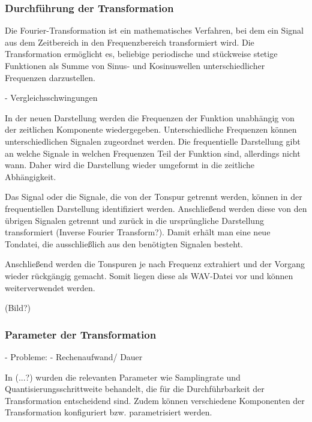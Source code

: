 \par

\subsubsection{Durchführung der Transformation}

Die Fourier-Transformation ist ein mathematisches Verfahren, bei dem ein Signal aus dem Zeitbereich in den Frequenzbereich transformiert wird. Die Transformation ermöglicht es, beliebige periodische und stückweise stetige Funktionen als Summe von Sinus- und Kosinuswellen unterschiedlicher Frequenzen darzustellen.

\par

 - Vergleichsschwingungen
 
\par

In der neuen Darstellung werden die Frequenzen der Funktion unabhängig von der zeitlichen Komponente wiedergegeben. Unterschiedliche Frequenzen können unterschiedlichen Signalen zugeordnet werden. Die frequentielle Darstellung gibt an welche Signale in welchen Frequenzen Teil der Funktion sind, allerdings nicht wann. Daher wird die Darstellung wieder umgeformt in die zeitliche Abhängigkeit.

\par

Das Signal oder die Signale, die von der Tonspur getrennt werden, können in der frequentiellen Darstellung identifiziert werden. Anschließend werden diese von den übrigen Signalen getrennt und zurück in die ursprüngliche Darstellung transformiert (Inverse Fourier Transform?). Damit erhält man eine neue Tondatei, die ausschließlich aus den benötigten Signalen besteht.

\par

Anschließend werden die Tonspuren je nach Frequenz extrahiert und der Vorgang wieder rückgängig gemacht. Somit liegen diese als WAV-Datei vor und können weiterverwendet werden.

%
(Bild?)
%

\subsubsection{Parameter der Transformation}

 - Probleme:
    - Rechenaufwand/ Dauer

In (...?) wurden die relevanten Parameter wie Samplingrate und Quantisierungsschrittweite behandelt, die für die Durchführbarkeit der Transformation entscheidend sind. Zudem können verschiedene Komponenten der Transformation konfiguriert bzw. parametrisiert werden.

